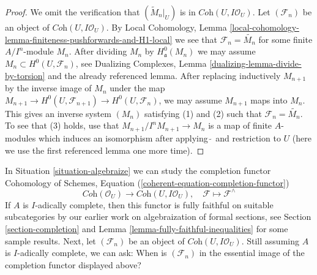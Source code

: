 \documentclass[10pt,a4paper]{amsart}
\theoremstyle{plain}
\theoremstyle{definition}
\theoremstyle{remark}
\numberwithin{equation}{subsection}
\begin{document}
\begin{proof}
We omit the verification that $(\widetilde{M}_n|_U)$ is in
$\textit{Coh}(U, I\mathcal{O}_U)$. Let $(\mathcal{F}_n)$
be an object of $\textit{Coh}(U, I\mathcal{O}_U)$.
By Local Cohomology, Lemma
\ref{local-cohomology-lemma-finiteness-pushforwards-and-H1-local}
we see that $\mathcal{F}_n = \widetilde{M_n}$ for some finite
$A/I^n$-module $M_n$. After dividing $M_n$ by $H^0_\mathfrak a(M_n)$
we may assume $M_n \subset H^0(U, \mathcal{F}_n)$, see
Dualizing Complexes, Lemma \ref{dualizing-lemma-divide-by-torsion}
and the already referenced lemma.
After replacing inductively $M_{n + 1}$ by the inverse image
of $M_n$ under the map $M_{n + 1} \to H^0(U, \mathcal{F}_{n + 1})
\to H^0(U, \mathcal{F}_n)$, we may assume $M_{n + 1}$ maps into
$M_n$. This gives an inverse system $(M_n)$ satisfying (1) and (2)
such that $\mathcal{F}_n = \widetilde{M_n}$. To see that (3)
holds, use that $M_{n + 1}/I^nM_{n + 1} \to M_n$ is a map
of finite $A$-modules which induces an isomorphism after
applying $\widetilde{\ }$ and restriction to $U$
(here we use the first referenced lemma one more time).
\end{proof}

\noindent
In Situation \ref{situation-algebraize} we can study the completion functor
Cohomology of Schemes, Equation (\ref{coherent-equation-completion-functor})
\begin{equation}
\label{equation-completion}
\textit{Coh}(\mathcal{O}_U)
\longrightarrow
\textit{Coh}(U, I\mathcal{O}_U),\quad
\mathcal{F} \longmapsto \mathcal{F}^\wedge
\end{equation}
If $A$ is $I$-adically complete, then this functor is fully faithful
on suitable subcategories by our earlier work on algebraization of
formal sections, see Section \ref{section-completion} and
Lemma \ref{lemma-fully-faithful-inequalities} for some sample results.
Next, let $(\mathcal{F}_n)$ be an object of $\textit{Coh}(U, I\mathcal{O}_U)$.
Still assuming $A$ is $I$-adically complete, we can ask:
When is $(\mathcal{F}_n)$ in the essential image of the completion
functor displayed above?
\end{document}
